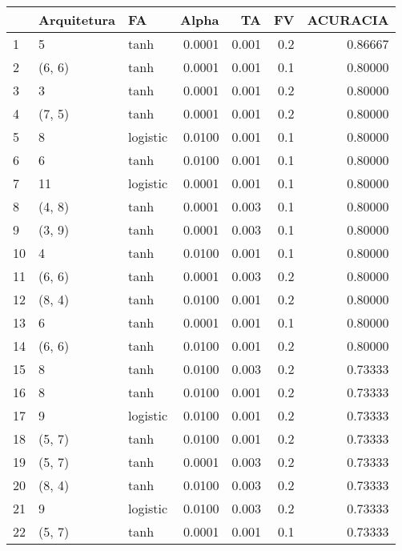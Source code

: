 \begin{tabular}{lllrrrr}
\toprule
{} & Arquitetura &        FA &   Alpha &     TA &   FV &  ACURACIA \\
\midrule
1   &           5 &      tanh &  0.0001 &  0.001 &  0.2 &   0.86667 \\
2   &      (6, 6) &      tanh &  0.0001 &  0.001 &  0.1 &   0.80000 \\
3   &           3 &      tanh &  0.0001 &  0.001 &  0.2 &   0.80000 \\
4   &      (7, 5) &      tanh &  0.0001 &  0.001 &  0.2 &   0.80000 \\
5   &           8 &  logistic &  0.0100 &  0.001 &  0.1 &   0.80000 \\
6   &           6 &      tanh &  0.0100 &  0.001 &  0.1 &   0.80000 \\
7   &          11 &  logistic &  0.0001 &  0.001 &  0.1 &   0.80000 \\
8   &      (4, 8) &      tanh &  0.0001 &  0.003 &  0.1 &   0.80000 \\
9   &      (3, 9) &      tanh &  0.0001 &  0.003 &  0.1 &   0.80000 \\
10  &           4 &      tanh &  0.0100 &  0.001 &  0.1 &   0.80000 \\
11  &      (6, 6) &      tanh &  0.0001 &  0.003 &  0.2 &   0.80000 \\
12  &      (8, 4) &      tanh &  0.0100 &  0.001 &  0.2 &   0.80000 \\
13  &           6 &      tanh &  0.0001 &  0.001 &  0.1 &   0.80000 \\
14  &      (6, 6) &      tanh &  0.0100 &  0.001 &  0.2 &   0.80000 \\
15  &           8 &      tanh &  0.0100 &  0.003 &  0.2 &   0.73333 \\
16  &           8 &      tanh &  0.0100 &  0.001 &  0.2 &   0.73333 \\
17  &           9 &  logistic &  0.0100 &  0.001 &  0.2 &   0.73333 \\
18  &      (5, 7) &      tanh &  0.0100 &  0.001 &  0.2 &   0.73333 \\
19  &      (5, 7) &      tanh &  0.0001 &  0.003 &  0.2 &   0.73333 \\
20  &      (8, 4) &      tanh &  0.0100 &  0.003 &  0.2 &   0.73333 \\
21  &           9 &  logistic &  0.0100 &  0.003 &  0.2 &   0.73333 \\
22  &      (5, 7) &      tanh &  0.0001 &  0.001 &  0.1 &   0.73333 \\

\end{tabular}
